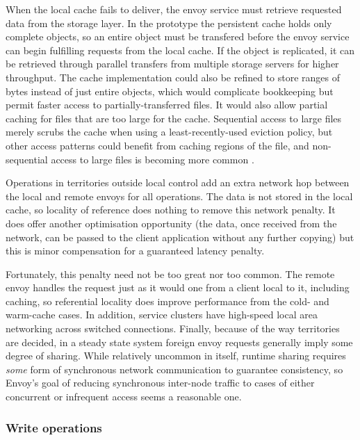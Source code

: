 When the local cache fails to deliver, the envoy service must retrieve requested data from the storage layer. In the prototype the persistent cache holds only complete objects, so an entire object must be transfered before the envoy service can begin fulfilling requests from the local cache. If the object is replicated, it can be retrieved through parallel transfers from multiple storage servers for higher throughput. The cache implementation could also be refined to store ranges of bytes instead of just entire objects, which would complicate bookkeeping but permit faster access to partially-transferred files. It would also allow partial caching for files that are too large for the cache. Sequential access to large files merely scrubs the cache when using a least-recently-used eviction policy, but other access patterns could benefit from caching regions of the file, and non-sequential access to large files is becoming more common \cite{roselli}.

Operations in territories outside local control add an extra network hop between the local and remote envoys for all operations. The data is not stored in the local cache, so locality of reference does nothing to remove this network penalty. It does offer another optimisation opportunity (the data, once received from the network, can be passed to the client application without any further copying) but this is minor compensation for a guaranteed latency penalty.

Fortunately, this penalty need not be too great nor too common. The remote envoy handles the request just as it would one from a client local to it, including caching, so referential locality does improve performance from the cold- and warm-cache cases. In addition, service clusters have high-speed local area networking across switched connections. Finally, because of the way territories are decided, in a steady state system foreign envoy requests generally imply some degree of sharing. While relatively uncommon in itself, runtime sharing requires \emph{some} form of synchronous network communication to guarantee consistency, so Envoy's goal of reducing synchronous inter-node traffic to cases of either concurrent or infrequent access seems a reasonable one.

\subsubsection{Write operations}\label{sec:data-paths-write}

